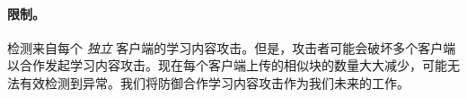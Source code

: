   
  
  \paragraph*{限制。}
  \sysnameF 检测来自每个 {\em 独立} 客户端的学习内容攻击。但是，攻击者可能会破坏多个客户端以合作发起学习内容攻击。现在每个客户端上传的相似块的数量大大减少，\sysnameF 可能无法有效检测到异常。我们将防御合作学习内容攻击作为我们未来的工作。